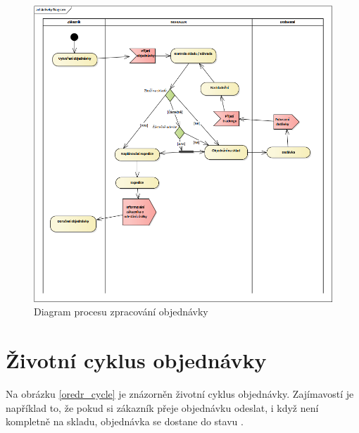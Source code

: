 \documentclass[thesis=B,czech]{FITthesis}[2012/06/26]
\begin{document}
\begin{figure}
	\includegraphics[width=\textwidth]{order_activity.png}
	\caption{Diagram procesu zpracování objednávky}\label{order_activity}
\end{figure}

\section{Životní cyklus objednávky}
	Na obrázku \ref{oredr_cycle} je znázorněn životní cyklus objednávky. Zajímavostí je například to, že pokud si zákazník přeje objednávku odeslat, i když není kompletně na skladu, objednávka se dostane do stavu . 
	
\end{document}
